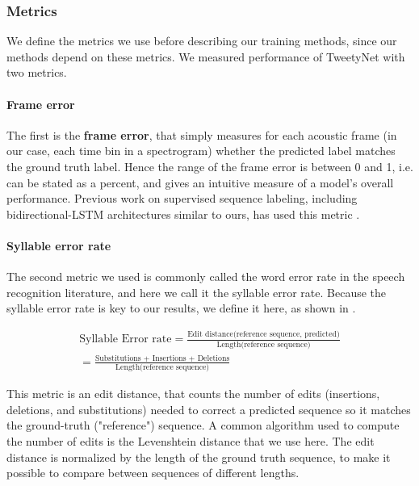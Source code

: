 \documentclass[9pt,lineno]{elife}
\begin{document}
\subsubsection{Metrics}
We define the metrics we use before describing our training methods, 
since our methods depend on these metrics.
We measured performance of TweetyNet with two metrics.

\label{methods:metrics}
\paragraph{Frame error}
The first is the \textbf{frame error}, 
that simply measures for each acoustic frame 
(in our case, each time bin in a spectrogram) 
whether the predicted label matches the ground truth 
label. Hence the range of the frame error is between 0 and 1, i.e. can be stated as a percent, and 
gives an intuitive measure of a model's overall performance. Previous work on supervised sequence labeling, including 
bidirectional-LSTM architectures similar to ours, has used this metric \citep{graves_supervised_2012,graves_framewise_2005}.  

\paragraph{Syllable error rate}
The second metric we used is commonly called the word error rate in the speech recognition literature, 
and here we call it the syllable error rate. 
Because the syllable error rate is key to our results, 
we define it here, as shown in .

\begin{equation}
\label{eq:syllable-error-rate}
\begin{split}
\text{Syllable Error rate} = 
\frac{\text{Edit distance(reference sequence, predicted)}}{\text{Length(reference sequence)}} \\ 
= \frac{\text{Substitutions + Insertions + Deletions}}{\text{Length(reference sequence)}}
\end{split}
\end{equation}

This metric is an edit distance, 
that counts the number of edits (insertions, deletions, and substitutions) 
needed to correct a predicted sequence so it matches the ground-truth ("reference") sequence.
A common algorithm used to compute the number of edits is the Levenshtein distance that we use here. 
The edit distance is normalized by the length of the ground truth sequence, 
to make it possible to compare between sequences of different lengths.
\end{document}
